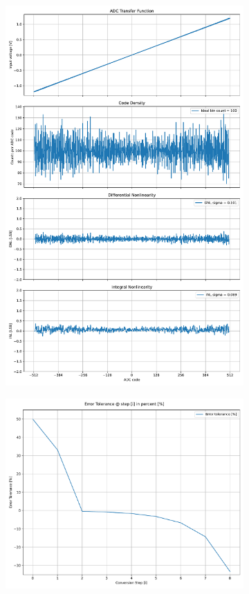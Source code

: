 \documentclass[varwidth]{standalone}
\begin{document}
\begin{figure}
\begin{subfigure}{0.32\textwidth}
    \includegraphics[width=\textwidth]{behavioral_10b_noisy_splitmsb_nonlinearity.pdf}
\end{subfigure}
\begin{subfigure}{0.32\textwidth}
    \includegraphics[width=\textwidth]{behavioral_10b_noisy_splitmsb_redundancy.pdf}

\end{subfigure}
\end{figure}
\end{document}

